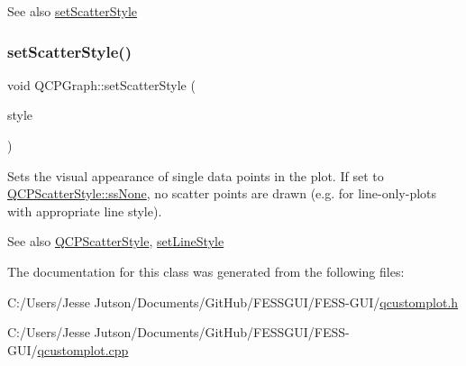 \begin{DoxySeeAlso}{See also}
\hyperlink{class_q_c_p_graph_a12bd17a8ba21983163ec5d8f42a9fea5}{set\+Scatter\+Style} 
\end{DoxySeeAlso}
\hypertarget{class_q_c_p_graph_a12bd17a8ba21983163ec5d8f42a9fea5}{}\label{class_q_c_p_graph_a12bd17a8ba21983163ec5d8f42a9fea5} 
\subsubsection{\texorpdfstring{set\+Scatter\+Style()}{setScatterStyle()}}
{\footnotesize\ttfamily void Q\+C\+P\+Graph\+::set\+Scatter\+Style (\begin{DoxyParamCaption}\item[{const \hyperlink{class_q_c_p_scatter_style}{Q\+C\+P\+Scatter\+Style} \&}]{style }\end{DoxyParamCaption})}

Sets the visual appearance of single data points in the plot. If set to \hyperlink{class_q_c_p_scatter_style_adb31525af6b680e6f1b7472e43859349abd144c291ca274f77053ec68cab6c022}{Q\+C\+P\+Scatter\+Style\+::ss\+None}, no scatter points are drawn (e.\+g. for line-\/only-\/plots with appropriate line style).

\begin{DoxySeeAlso}{See also}
\hyperlink{class_q_c_p_scatter_style}{Q\+C\+P\+Scatter\+Style}, \hyperlink{class_q_c_p_graph_a513fecccff5b2a50ce53f665338c60ff}{set\+Line\+Style} 
\end{DoxySeeAlso}


The documentation for this class was generated from the following files\+:\begin{DoxyCompactItemize}
\item 
C\+:/\+Users/\+Jesse Jutson/\+Documents/\+Git\+Hub/\+F\+E\+S\+S\+G\+U\+I/\+F\+E\+S\+S-\/\+G\+U\+I/\hyperlink{qcustomplot_8h}{qcustomplot.\+h}\item 
C\+:/\+Users/\+Jesse Jutson/\+Documents/\+Git\+Hub/\+F\+E\+S\+S\+G\+U\+I/\+F\+E\+S\+S-\/\+G\+U\+I/\hyperlink{qcustomplot_8cpp}{qcustomplot.\+cpp}\end{DoxyCompactItemize}
